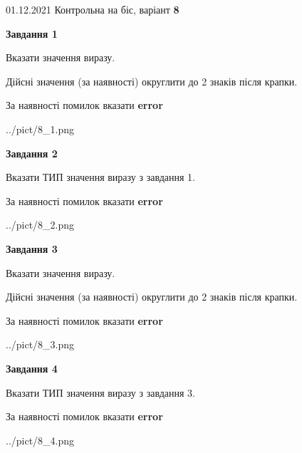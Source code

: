 \documentclass[11pt, ukrainian]{article}
\begin{document}
{01.12.2021 Контрольна на біс, варіант  \No \textbf { 8 }\par}
{
\begin {large}
{\begin {center}\textbf{Завдання 1}\end {center}}\par
Вказати значення виразу. \par
Дійсні значення (за наявності) округлити до 2 знаків після крапки. \par
За наявності помилок вказати \textbf{error}

\begin{center}
	{../pict/8_1.png}
\end{center}
\newpage

{\begin {center}\textbf{Завдання 2}\end {center}}\par
Вказати ТИП значення виразу з завдання 1. \par
За наявності помилок вказати \textbf{error}

\begin{center}
	{../pict/8_2.png}
\end{center}
\newpage

{\begin {center}\textbf{Завдання 3}\end {center}}\par
Вказати значення виразу. \par
Дійсні значення (за наявності) округлити до 2 знаків після крапки. \par
За наявності помилок вказати \textbf{error}

\begin{center}
	{../pict/8_3.png}
\end{center}
\newpage

{\begin {center}\textbf{Завдання 4}\end {center}}\par
Вказати ТИП значення виразу з завдання 3. \par
За наявності помилок вказати \textbf{error}

\begin{center}
	{../pict/8_4.png}
\end{center}
\newpage


\end{large}}
\end{document}
